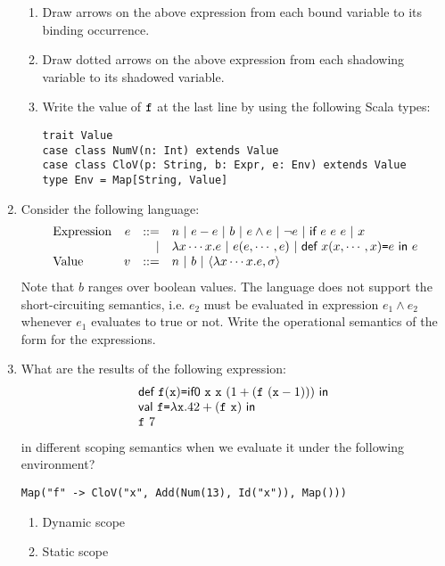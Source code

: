 \begin{enumerate}
\begin{enumerate}
\item Draw arrows on the above expression from each bound variable to its binding occurrence.
\item Draw dotted arrows on the above expression from each shadowing variable to its shadowed variable.
\item Write the value of $\texttt{f}$ at the last line by using the following Scala types:
\begin{verbatim}
trait Value
case class NumV(n: Int) extends Value
case class CloV(p: String, b: Expr, e: Env) extends Value
type Env = Map[String, Value]
\end{verbatim}
\end{enumerate}

\item Consider the following language:
\[
\begin{array}{lrrl}
  \text{Expression} & e & ::= & n\ |\ \esub{e}{e}\ |\ b\ |\ e\wedge e\ |\ \neg
  e\ |\ \textsf{if}\ e\ e\ e\ |\ x \\
  &&|& \efun{x\cdots x}{e}\ |\ \eappfo{e}{e,\cdots,e}\ |\
  \erec{x}{x,\cdots,x}{e}{e} \\
  \text{Value} & v & ::= & n\ |\ b\ |\ \clov{x\cdots x}{e}{\sigma} \\
\end{array}
\]
Note that $b$ ranges over boolean values. The language does not support the short-circuiting
semantics, i.e. $e_2$ must be evaluated in expression $e_1\wedge e_2$ whenever $e_1$
evaluates to true or not.
Write the operational semantics of the form  for the expressions.

\item What are the results of the following expression:
\[
  \begin{array}{l}
  \textsf{def}\ \texttt{f}(\texttt{x})\texttt{=}\textsf{if0}\ \texttt{x}\ \texttt{x}\ (1+(\texttt{f}\ (\texttt{x}-1)))\ \textsf{in}\ \\
  \textsf{val}\ \texttt{f}\texttt{=}\lambda\texttt{x}.42+(\texttt{f}\ \texttt{x})\ \textsf{in}\ \\
  \texttt{f}\ 7
 
 
  \end{array}
\]
in different scoping semantics when we evaluate it under the following environment?
\begin{verbatim}
Map("f" -> CloV("x", Add(Num(13), Id("x")), Map()))
\end{verbatim}

\begin{enumerate}
  \item Dynamic scope
  \item Static scope
\end{enumerate}
\end{enumerate}
